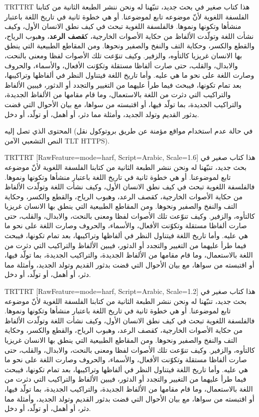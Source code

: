 \documentclass{article}
\def\mode{}
\def\mode{RawFeature={mode=harf}}
\begin{document}
\begingroup\pardir TRT\textdir TRT
هذا كتاب صغير في بحث جديد، تنبّهنا له ونحن ننشر الطبعة الثانية من كتابنا الفلسفة
اللغوية لأنّ موضوعه تابع لموضوعنا. أو هي خطوة ثانية في تاريخ اللغة باعتبار
منشأها وتكونها ونموها. فالفلسفة اللغوية تبحث في كيف نطق الانسان الأول، وكيف
نشأت اللغة وتولّدت الألفاظ من حكاية الأصوات الخارجية، ك\textbf{قصف الرعد}، وهبوب الرياح،
والقطع والكسر، وحكاية التف والنفخ والصفير ونحوها. ومن المقاطع الطبيعية التي
ينطق بها الانسان غريزيا كالتأوه، والزفير. وكيف تنوّعت تلك الأصوات لفظا ومعنى
بالنحت، والابدال، والقلب، حتى صارت ألفاظا مستقلة وتكوّنت الأفعال، والأسماء،
والحروف وصارت اللغة على نحو ما هي عليه.  وأما تاريخ اللغة فيتناول النظر في
ألفاظها وتراكيبها، بعد تمام تكونها، فيبحث فيما طرأ عليهما من التغيير والتجدد أو
الدثور، فيبين الألفاظ والتراكيب التي دثرت من اللغة بالاستعمال، وما قام مقامها
من الألفاظ الجديدة، والتراكيب الجديدة، بما تولّد فيها، أو اقتبسته من سواها، مع
بيان الأحوال التي قضت بدثور القديم وتولد الجديد، وأمثلة مما دثر، أو أهمل، أو
تولّد، أو دخل.

المحتوى الذي تصل إليه (في حالة عدم استخدام مواقع مؤمنة عن طريق بروتوكول نقل
النص التشعبي الآمن {\textdir TLT HTTPS}).
\par\endgroup\newpage

\def\arabictext{%
هذا كتاب صغير في بحث جديد، تنبّهنا له ونحن ننشر الطبعة الثانية من كتابنا الفلسفة
اللغوية لأنّ موضوعه تابع لموضوعنا. أو هي خطوة ثانية في تاريخ اللغة باعتبار
منشأها وتكونها ونموها. فالفلسفة اللغوية تبحث في كيف نطق الانسان الأول، وكيف
نشأت اللغة وتولّدت الألفاظ من حكاية الأصوات الخارجية، كقصف الرعد، وهبوب الرياح،
والقطع والكسر، وحكاية التف والنفخ والصفير ونحوها. ومن المقاطع الطبيعية التي
ينطق بها الانسان غريزيا كالتأوه، والزفير. وكيف تنوّعت تلك الأصوات لفظا ومعنى
بالنحت، والابدال، والقلب، حتى صارت ألفاظا مستقلة وتكوّنت الأفعال، والأسماء،
والحروف وصارت اللغة على نحو ما هي عليه.  وأما تاريخ اللغة فيتناول النظر في
ألفاظها وتراكيبها، بعد تمام تكونها، فيبحث فيما طرأ عليهما من التغيير والتجدد أو
الدثور، فيبين الألفاظ والتراكيب التي دثرت من اللغة بالاستعمال، وما قام مقامها
من الألفاظ الجديدة، والتراكيب الجديدة، بما تولّد فيها، أو اقتبسته من سواها، مع
بيان الأحوال التي قضت بدثور القديم وتولد الجديد، وأمثلة مما دثر، أو أهمل، أو
تولّد، أو دخل.%
}

\begingroup\pardir TRT\textdir TRT
[\mode, Script=Arabic, Scale=1.6]
\arabictext
\par\endgroup\newpage

\begingroup\pardir TRT\textdir TRT
[\mode, Script=Arabic, Scale=1.2]
\arabictext
\par\endgroup\newpage
\end{document}
